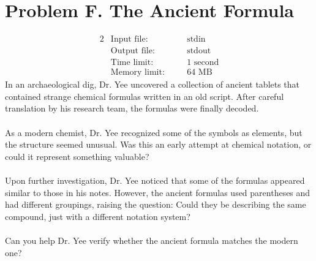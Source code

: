 \documentclass[12pt,a4paper]{article}
\begin{document}
\newpage

\section*{\fontsize{18}{12}Problem F. The Ancient Formula}

\begin{alignat*} {2}
 &   \text{Input file:}   \quad     &&\text{stdin}\\
 &   \text{Output file:}  \quad     &&\text{stdout}\\
 &   \text{Time limit:}   \quad     &&\text{1 second}\\
 &   \text{Memory limit:} \quad     &&\text{64 MB}
\end{alignat*}
\noindent
In an archaeological dig, Dr. Yee uncovered a collection of ancient tablets that contained strange chemical formulas written in an old script. After careful translation by his research team, the formulas were finally decoded.
\\\\
\noindent
As a modern chemist, Dr. Yee recognized some of the symbols as elements, but the structure seemed unusual. Was this an early attempt at chemical notation, or could it represent something valuable?
\\\\
\noindent
Upon further investigation, Dr. Yee noticed that some of the formulas appeared similar to those in his notes. However, the ancient formulas used parentheses and had different groupings, raising the question: Could they be describing the same compound, just with a different notation system?
\\\\
\noindent
Can you help Dr. Yee verify whether the ancient formula matches the modern one?
\end{document}
